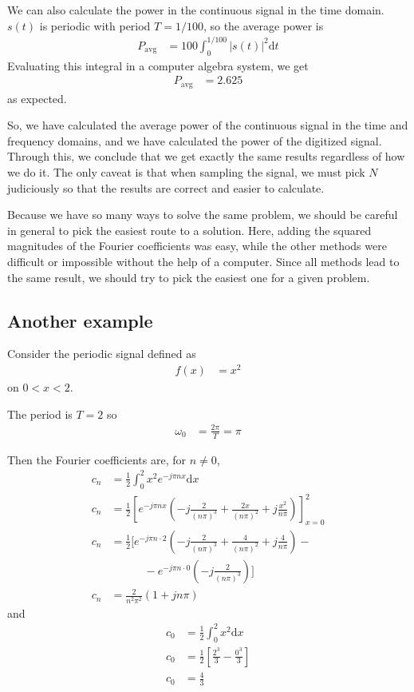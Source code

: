 \documentclass[twocolumn]{myarticle}
\renewcommand{\d}{\mathrm{d}}
\begin{document}
We can also calculate the power in the continuous signal in the time domain.
$ s(t) $ is periodic with period $ T = 1/100 $, so the average power is
\begin{align}
    P_\text{avg} &= 100 \int_0^{1/100} \left| s(t) \right|^2 \d t
\end{align}
Evaluating this integral in a computer algebra system, we get
\begin{align}
    P_\text{avg} &= 2.625
\end{align}
as expected.

So, we have calculated the average power of the continuous signal in the time and frequency domains, and we have calculated the power of the digitized signal.
Through this, we conclude that we get exactly the same results regardless of how we do it.
The only caveat is that when sampling the signal, we must pick $ N $ judiciously so that the results are correct and easier to calculate.

Because we have so many ways to solve the same problem, we should be careful in general to pick the easiest route to a solution.
Here, adding the squared magnitudes of the Fourier coefficients was easy, while the other methods were difficult or impossible without the help of a computer.
Since all methods lead to the same result, we should try to pick the easiest one for a given problem.

\subsection{Another example}
\label{subsec:another_example}

Consider the periodic signal defined as
\begin{align}
    f(x) &= x^2
\end{align}
on $ 0 < x < 2 $.

The period is $ T = 2 $ so
\begin{align}
    \omega_0 &= \frac{2 \pi}{T} = \pi
\end{align}

Then the Fourier coefficients are, for $ n \neq 0 $,
\begin{align}
    c_n &= \frac{1}{2} \int_{0}^{2} x^2 e^{-j \pi n x} \d x
    \\
    c_n &= \frac{1}{2} \left[ e^{-j \pi n x} \left( - j \frac{2}{(n\pi)^3} + \frac{2 x}{(n\pi)^2} + j \frac{x^2}{n \pi}\right)  \right]_{x=0}^2
    \\
    c_n &= \frac{1}{2} \Bigg[ e^{-j \pi n \cdot 2} \left( - j \frac{2}{(n\pi)^3} + \frac{4}{(n\pi)^2} + j \frac{4}{n \pi}\right) - \nonumber
    \\
    & \qquad \quad - e^{- j \pi n \cdot 0} \left( -j\frac{2}{(n\pi)^3} \right) \Bigg]
    \\
    c_n &= \frac{2}{n^2 \pi^2} \left( 1 + j n \pi \right)
\end{align}
and
\begin{align}
    c_0 &= \frac{1}{2} \int_{0}^{2} x^2 \d x
    \\
    c_0 &= \frac{1}{2} \left[ \frac{2^3}{3} - \frac{0^3}{3} \right]
    \\
    c_0 &= \frac{4}{3}
\end{align}
\end{document}
